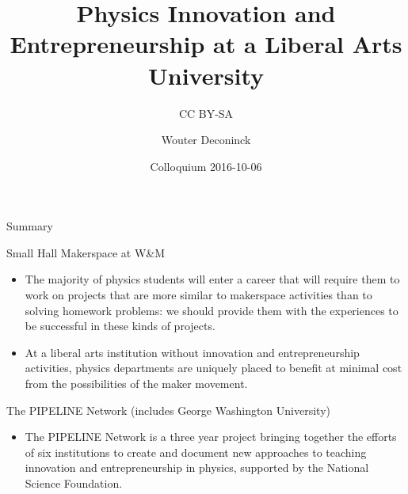 \documentclass[xcolor=table,compress,professionalfonts,pdfpagelabels]{beamer}
\title{Physics Innovation and Entrepreneurship at a Liberal Arts University}
\subtitle{CC BY-SA}
\author{Wouter Deconinck}
\institute{William \& Mary, Physics}
\date{Colloquium 2016-10-06}
\begin{document}
%


\begin{frame}[plain]
 \maketitle
\end{frame}

\begin{frame}[label=summary]{Summary}
 \begin{block}{Small Hall Makerspace at W\&M}
  \begin{itemize}
   \item The majority of physics students will enter a career that will require them to work on projects that are more similar to makerspace activities than to solving homework problems: we should provide them with the experiences to be successful in these kinds of projects.
   \item At a liberal arts institution without innovation and entrepreneurship activities, physics departments are uniquely placed to benefit at minimal cost from the possibilities of the maker movement.
  \end{itemize}
 \end{block}
 \begin{block}{The PIPELINE Network\footnotemark{} (includes George Washington University)}
  \begin{itemize}
   \item The PIPELINE Network is a three year project bringing together the efforts of six institutions to create and document new approaches to teaching innovation and entrepreneurship in physics, supported by the National Science Foundation.
  \end{itemize}
 \end{block}
\end{frame}
\end{document}
